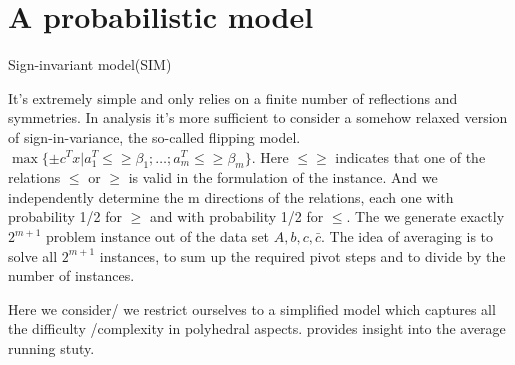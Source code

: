 \documentclass{article}
\begin{document}
\section{A probabilistic model}

Sign-invariant model(SIM) 

It's extremely simple and only relies on a finite number of reflections and symmetries. In analysis it's more sufficient to consider a somehow relaxed version of sign-in-variance, the so-called flipping model.
$\max\{\pm c^T x|a_1^T\leqslant \geqslant \beta_1; \dots ; a_m^T\leqslant \geqslant \beta_m\}$. Here $\leqslant\geqslant$ indicates that one of the relations $\leqslant$ or $\geqslant$ is valid in the formulation of the instance. And we independently determine the m directions of the relations, each one with probability 1/2 for $\geqslant$ and with probability 1/2 for $\leqslant$. The we generate exactly $2^{m+1}$ problem instance out of the data set $A, b, c, \bar{c}$.  The idea of averaging is to solve all $2^{m+1}$ instances, to sum up the required pivot steps and to divide by the number of instances.

Here we consider/ we restrict ourselves to a simplified model which captures all the difficulty /complexity in polyhedral aspects. provides insight into the average running stuty.
\end{document}
